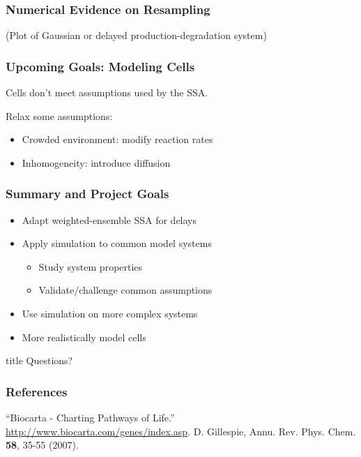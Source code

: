 \documentclass[xcolor={usenames,dvipsnames,svgnames}]{beamer}
\begin{document}
\begin{frame}
    \frametitle{Numerical Evidence on Resampling}
    (Plot of Gaussian or delayed production-degradation system)
\end{frame}


\begin{frame}
    \frametitle{Upcoming Goals: Modeling Cells}
    Cells don't meet assumptions used by the SSA.

    Relax some assumptions:
    \begin{itemize}
        \item Crowded environment: modify reaction rates
        \item Inhomogeneity: introduce diffusion
    \end{itemize}
\end{frame}

\begin{frame}
    \frametitle{Summary and Project Goals}
    \begin{itemize}
        \item Adapt weighted-ensemble SSA for delays
        \item Apply simulation to common model systems
        \begin{itemize}
            \item Study system properties
            \item Validate/challenge common assumptions
        \end{itemize}
        \item Use simulation on more complex systems
        \item More realistically model cells
    \end{itemize}
\end{frame}

\begin{frame}[plain]

\hfill
    \begin{beamercolorbox}[rounded=true, center, shadow=true,wd=6cm]{title}
        \huge Questions?
    \end{beamercolorbox}
\hfill\hfill

\end{frame}

\appendix

\begin{frame}
    \frametitle{References}
    \begin{thebibliography}{9}
         ``Biocarta - Charting Pathways of Life.'' \url{http://www.biocarta.com/genes/index.asp}.
         D. Gillespie, Annu. Rev. Phys. Chem. \textbf{58}, 35-55 (2007).
        
    \end{thebibliography}
\end{frame}
\end{document}
